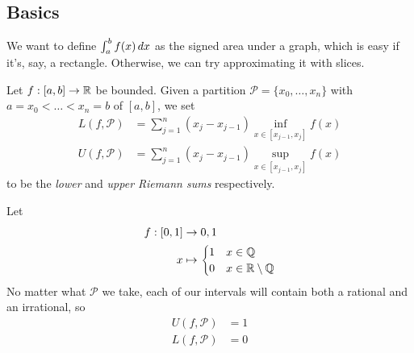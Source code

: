 \documentclass{../template/note}
\begin{document}
    \subsection{Basics}

    We want to define \(\int_a^b f(x) \,d{x}\) as the signed area under a graph, which is easy if it's, say, a rectangle. Otherwise, we can try approximating it with slices.
    
    \begin{definition}
        Let \(f: [a, b] \to \mathbb R\) be bounded. Given a partition \(\mathcal P = \{x_0, \dots, x_n\}\) with \(a = x_0 < \dots < x_n = b\) of \([a, b]\), we set
        \begin{align*}
            L(f, \mathcal P) &= \sum_{j=1}^n (x_j-x_{j-1})\inf_{x \in [x_{j-1},x_j]}f(x)\\
            U(f, \mathcal P) &= \sum_{j=1}^n (x_j-x_{j-1})\sup_{x \in [x_{j-1},x_j]}f(x)
        \end{align*}
        to be the \emph{lower} and \emph{upper Riemann sums} respectively.
    \end{definition}
    
    \begin{example*}
        Let
        \begin{align*}
            f: [0, 1] &\to {0, 1} \\
            x &\mapsto \begin{cases}
                1 & x \in \mathbb Q \\
                0 & x \in \mathbb R \setminus \mathbb Q
            \end{cases}
        \end{align*}
        No matter what \(\mathcal P\) we take, each of our intervals will contain both a rational and an irrational, so
        \begin{align*}
            U(f, \mathcal P) &= 1 \\
            L(f, \mathcal P) &= 0
        \end{align*}
    \end{example*}
    
\end{document}
